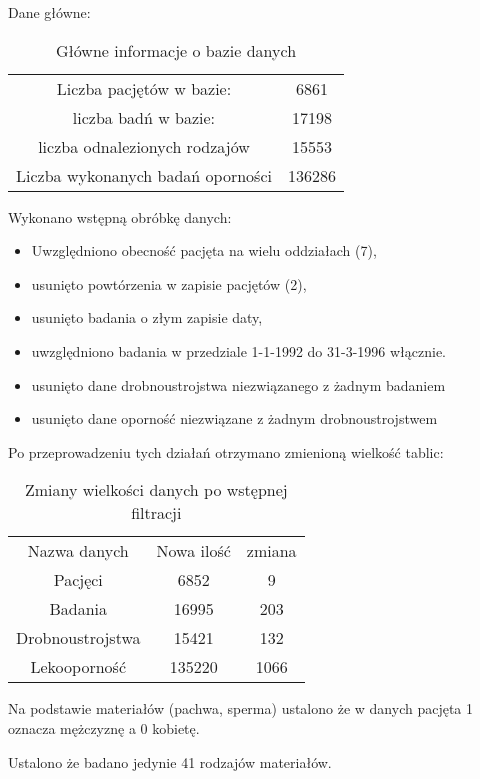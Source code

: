 \documentclass[a4paper,12pt]{article}
\begin{document}
Dane główne:
\begin{table}[h]
\begin{center}
\caption{Główne informacje o bazie danych}
\begin{tabular}{cc}
\hline
Liczba pacjętów w bazie: & 6861 \\
liczba badń w bazie: & 17198 \\
liczba odnalezionych rodzajów & 15553 \\
Liczba wykonanych badań oporności & 136286  \\
\hline
\end{tabular}
\end{center}
\end{table}

Wykonano wstępną obróbkę danych:
\begin{itemize}
  \item Uwzględniono obecność pacjęta na wielu oddziałach (7),
  \item usunięto powtórzenia w zapisie pacjętów (2), 
  \item usunięto badania o złym zapisie daty,
  \item uwzględniono badania w przedziale 1-1-1992 do 31-3-1996 włącznie.
  \item usunięto dane drobnoustrojstwa niezwiązanego z żadnym badaniem
  \item usunięto dane oporność niezwiązane z żadnym drobnoustrojstwem
\end{itemize}

Po przeprowadzeniu tych działań otrzymano zmienioną wielkość tablic:
\begin{table}[h]
\begin{center}
\caption{Zmiany wielkości danych po wstępnej filtracji}
\begin{tabular}{c|c|c}
\hline
Nazwa danych & Nowa ilość & zmiana \\
Pacjęci & 6852 & 9 \\
Badania & 16995  & 203\\
Drobnoustrojstwa & 15421 & 132\\
Lekooporność & 135220 & 1066 \\
\hline
\end{tabular}
\end{center}
\end{table}

Na podstawie materiałów (pachwa, sperma) ustalono że w danych pacjęta 1 oznacza mężczyznę a 0 kobietę.

Ustalono że badano jedynie 41 rodzajów materiałów.
\end{document}
